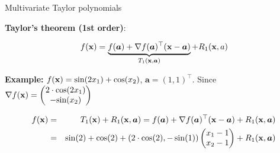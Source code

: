 \begin{vbframe}{Multivariate Taylor polynomials}

\textbf{Taylor's theorem (1st order)}: 

$$
  f(\mathbf{x}) = \underbrace{f(\bm{a}) + \nabla f(\bm{a})^\top (\mathbf{x} - \bm{a})}_{T_1(\mathbf{x}, \bm{a})} + R_1(\mathbf{x}, a) 
$$

\vspace*{-0.3cm}

\begin{footnotesize} \textbf{Example: } $f(\mathbf{x}) = \text{sin}(2x_1) + \text{cos}(x_2)$, $\bm{a} = (1, 1)^\top$. Since $\nabla f(\mathbf{x}) = \begin{pmatrix} 2\cdot\text{cos}(2x_1) \\ -\text{sin}(x_2) \end{pmatrix}$

\vspace*{-0.3cm}

\begin{eqnarray*}
  f(\mathbf{x}) &=& T_1(\mathbf{x}) + R_1(\mathbf{x}, \bm{a}) = f(\bm{a}) + \nabla f(\bm{a})^\top (\mathbf{x} - \bm{a}) + R_1(\mathbf{x}, \bm{a})\\ &=& \sin(2) + \cos(2) + (2 \cdot \cos(2), - \sin(1))\begin{pmatrix} x_1 - 1 \\ x_2 - 1\end{pmatrix} + R_1(\mathbf{x}, \bm{a})
\end{eqnarray*}

\end{footnotesize}

\vspace*{-0.3cm}


\end{vbframe}
